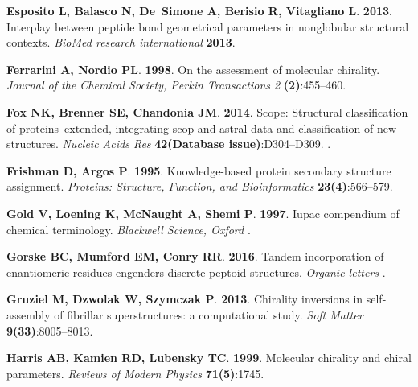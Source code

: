 \documentclass[fleqn,10pt,lineno]{wlpeerj} %
\begin{document}
\begin{thebibliography}{58}
\textbf{Esposito L, Balasco N, De~Simone A, Berisio R, Vitagliano L}.
  \textbf{2013}.
\newblock Interplay between peptide bond geometrical parameters in nonglobular
  structural contexts.
\newblock \emph{BioMed research international} \textbf{2013}.

\textbf{Ferrarini A, Nordio PL}. \textbf{1998}.
\newblock On the assessment of molecular chirality.
\newblock \emph{Journal of the Chemical Society, Perkin Transactions 2}
  \textbf{(2)}:455--460.

\textbf{Fox NK, Brenner SE, Chandonia JM}. \textbf{2014}.
\newblock Scope: Structural classification of proteins--extended, integrating
  scop and astral data and classification of new structures.
\newblock \emph{Nucleic Acids Res} \textbf{42(Database issue)}:D304--D309.
\newblock {}.

\textbf{Frishman D, Argos P}. \textbf{1995}.
\newblock Knowledge-based protein secondary structure assignment.
\newblock \emph{Proteins: Structure, Function, and Bioinformatics}
  \textbf{23(4)}:566--579.

\textbf{Gold V, Loening K, McNaught A, Shemi P}. \textbf{1997}.
\newblock Iupac compendium of chemical terminology.
\newblock \emph{Blackwell Science, Oxford} .

\textbf{Gorske BC, Mumford EM, Conry RR}. \textbf{2016}.
\newblock Tandem incorporation of enantiomeric residues engenders discrete
  peptoid structures.
\newblock \emph{Organic letters} .

\textbf{Gruziel M, Dzwolak W, Szymczak P}. \textbf{2013}.
\newblock Chirality inversions in self-assembly of fibrillar superstructures: a
  computational study.
\newblock \emph{Soft Matter} \textbf{9(33)}:8005--8013.

\textbf{Harris AB, Kamien RD, Lubensky TC}. \textbf{1999}.
\newblock Molecular chirality and chiral parameters.
\newblock \emph{Reviews of Modern Physics} \textbf{71(5)}:1745.


\end{thebibliography}
\end{document}
